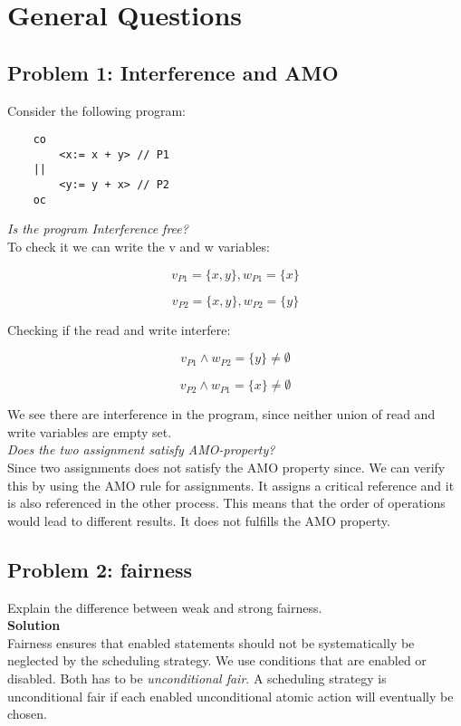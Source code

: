 \section{General Questions}


\subsection{Problem 1: Interference and AMO}

Consider the following program:

\begin{lstlisting}
    co 
        <x:= x + y> // P1
    ||
        <y:= y + x> // P2
    oc
\end{lstlisting}

\textit{Is the program Interference free?} \\

To check it we can write the v and w variables:

\[
v_{P1} = \{x, y\}, w_{P1} = \{x\}
\]

\[
v_{P2} = \{x, y\}, w_{P2} = \{y\}
\]

Checking if the read and write interfere:

\[
    v_{P1} \land w_{P2} = \{y\} \neq \emptyset
\]

\[
    v_{P2} \land w_{P1} = \{x\} \neq \emptyset
\]

We see there are interference in the program, since neither union of read and write variables are empty set. \\


\textit{Does the two assignment satisfy AMO-property?} \\

Since two assignments does not satisfy the AMO property since.
We can verify this by using the AMO rule for assignments. 
It assigns a critical reference and it is also referenced in the other process. 
This means that the order of operations would lead to different results. 
It does not fulfills the AMO property. 

\subsection{Problem 2: fairness}

Explain the difference between weak and strong fairness. \\

\textbf{Solution} \\

Fairness ensures that enabled statements should not be systematically be neglected by the scheduling strategy.
We use conditions that are enabled or disabled. Both has to be \textit{unconditional fair}. 
A scheduling strategy is unconditional fair if each enabled unconditional atomic action will eventually be chosen. 

